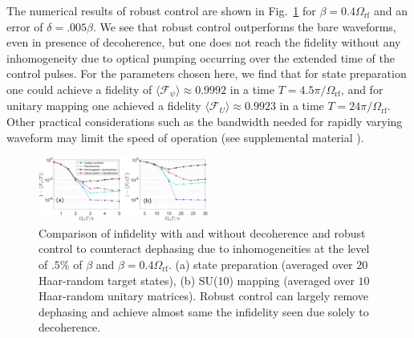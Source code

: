 \documentclass[aps,prl,twocolumn,reprint,superscriptaddress,footinbib]{revtex4-2}
\begin{document}
The numerical results of robust control are shown in Fig.~\ref{fig:inhomogenity} for $\beta=0.4\Omega_{\mathrm{rf}}$ and an error of  $\delta = .005 \beta$. We see that robust control outperforms the bare waveforms, even in presence of decoherence, but one does not reach the fidelity without any inhomogeneity due to optical pumping occurring over the extended time of the control pulses. For the parameters chosen here, we find that for state preparation one could achieve a fidelity of $\langle \mathcal{F}_\psi \rangle \approx 0.9992$ in a time $T={4.5}\pi/\Omega_\text{rf}$, and for unitary mapping one achieved a fidelity  $\langle \mathcal{F}_U \rangle \approx 0.9923$  in a time $T={24}\pi/\Omega_\text{rf}$. 
Other practical considerations such as the bandwidth needed for rapidly varying waveform may limit the speed of operation (see supplemental material \cite{notes1}).
\begin{figure}

\includegraphics[width=0.5\textwidth]{robust_new.eps}

\caption{ Comparison of infidelity with and without decoherence and robust control to counteract dephasing due to inhomogeneities at the level of $.5\%$ of $\beta$ and $\beta=0.4\Omega_{\mathrm{rf}}$.  (a) state preparation (averaged over $20$ Haar-random target states),  (b) SU(10) mapping (averaged over $10$ Haar-random unitary matrices). Robust control can largely remove dephasing and achieve almost same the infidelity seen due solely to decoherence.}
\label{fig:inhomogenity} 
\end{figure}
\end{document}
